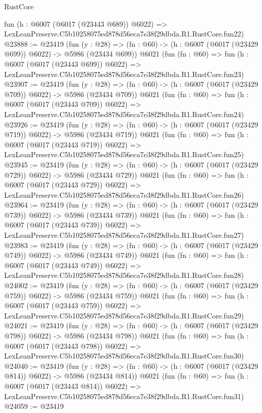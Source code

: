 \begin{lexlean}{RustCore}
\begin{coremodule}
    fun (h : @6007 (@6017 (@23443 @689)) @6022) =>
    LexLeanPreserve.C5b10258075ed878d56eca7e38f29dbda.R1.RustCore.fun22)
@23888 := @23419
    (fun (y : @28) => (fn : @60) -> (h : @6007 (@6017 (@23429 @699)) @6022) -> @5986 (@23434 @699))
    @6021
    (fun (fn : @60) =>
    fun (h : @6007 (@6017 (@23443 @699)) @6022) =>
    LexLeanPreserve.C5b10258075ed878d56eca7e38f29dbda.R1.RustCore.fun23)
@23907 := @23419
    (fun (y : @28) => (fn : @60) -> (h : @6007 (@6017 (@23429 @709)) @6022) -> @5986 (@23434 @709))
    @6021
    (fun (fn : @60) =>
    fun (h : @6007 (@6017 (@23443 @709)) @6022) =>
    LexLeanPreserve.C5b10258075ed878d56eca7e38f29dbda.R1.RustCore.fun24)
@23926 := @23419
    (fun (y : @28) => (fn : @60) -> (h : @6007 (@6017 (@23429 @719)) @6022) -> @5986 (@23434 @719))
    @6021
    (fun (fn : @60) =>
    fun (h : @6007 (@6017 (@23443 @719)) @6022) =>
    LexLeanPreserve.C5b10258075ed878d56eca7e38f29dbda.R1.RustCore.fun25)
@23945 := @23419
    (fun (y : @28) => (fn : @60) -> (h : @6007 (@6017 (@23429 @729)) @6022) -> @5986 (@23434 @729))
    @6021
    (fun (fn : @60) =>
    fun (h : @6007 (@6017 (@23443 @729)) @6022) =>
    LexLeanPreserve.C5b10258075ed878d56eca7e38f29dbda.R1.RustCore.fun26)
@23964 := @23419
    (fun (y : @28) => (fn : @60) -> (h : @6007 (@6017 (@23429 @739)) @6022) -> @5986 (@23434 @739))
    @6021
    (fun (fn : @60) =>
    fun (h : @6007 (@6017 (@23443 @739)) @6022) =>
    LexLeanPreserve.C5b10258075ed878d56eca7e38f29dbda.R1.RustCore.fun27)
@23983 := @23419
    (fun (y : @28) => (fn : @60) -> (h : @6007 (@6017 (@23429 @749)) @6022) -> @5986 (@23434 @749))
    @6021
    (fun (fn : @60) =>
    fun (h : @6007 (@6017 (@23443 @749)) @6022) =>
    LexLeanPreserve.C5b10258075ed878d56eca7e38f29dbda.R1.RustCore.fun28)
@24002 := @23419
    (fun (y : @28) => (fn : @60) -> (h : @6007 (@6017 (@23429 @759)) @6022) -> @5986 (@23434 @759))
    @6021
    (fun (fn : @60) =>
    fun (h : @6007 (@6017 (@23443 @759)) @6022) =>
    LexLeanPreserve.C5b10258075ed878d56eca7e38f29dbda.R1.RustCore.fun29)
@24021 := @23419
    (fun (y : @28) => (fn : @60) -> (h : @6007 (@6017 (@23429 @798)) @6022) -> @5986 (@23434 @798))
    @6021
    (fun (fn : @60) =>
    fun (h : @6007 (@6017 (@23443 @798)) @6022) =>
    LexLeanPreserve.C5b10258075ed878d56eca7e38f29dbda.R1.RustCore.fun30)
@24040 := @23419
    (fun (y : @28) => (fn : @60) -> (h : @6007 (@6017 (@23429 @814)) @6022) -> @5986 (@23434 @814))
    @6021
    (fun (fn : @60) =>
    fun (h : @6007 (@6017 (@23443 @814)) @6022) =>
    LexLeanPreserve.C5b10258075ed878d56eca7e38f29dbda.R1.RustCore.fun31)
@24059 := @23419

\end{coremodule}
\end{lexlean}
